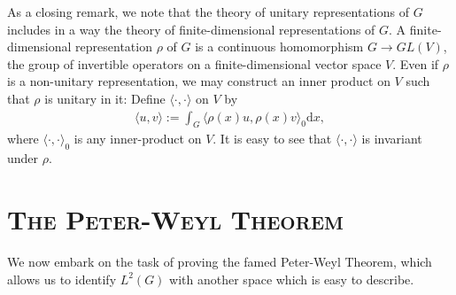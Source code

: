 \documentclass[10pt,twoside,openany,final]{memoir}
\newcommand{\sssection}[1]{%
\section[#1]{\centering\normalfont\scshape \textbf{#1}}}
\theoremstyle{definition}
\theoremstyle{Break}
\renewcommand{\d}{\mathrm{d}}
\begin{document}
As a closing remark, we note that the theory of unitary representations of $G$ includes in a way the theory of finite-dimensional representations of $G$. A finite-dimensional representation $\rho$ of $G$ is a continuous homomorphism $G \to GL(V)$, the group of invertible operators on a finite-dimensional vector space $V$. Even if $\rho$ is a non-unitary representation, we may construct an inner product on $V$ such that $\rho$ is unitary in it: Define $\langle \cdot , \cdot \rangle$ on $V$ by
\begin{align*}
	\langle u,v \rangle := \int_{G} \langle \rho(x) u , \rho(x) v \rangle_0 \d x,
\end{align*}
where $\langle \cdot,\cdot \rangle_0$ is any inner-product on $V$. It is easy to see that $\langle \cdot,\cdot \rangle$ is invariant under $\rho$.

\sssection{The Peter-Weyl Theorem}
We now embark on the task of proving the famed Peter-Weyl Theorem, which allows us to identify $L^2(G)$ with another space which is easy to describe. 
\end{document}
